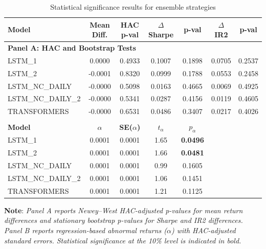 \documentclass[]{elsarticle}
\begin{document}
\begin{table}[H]
\centering
\small
\setlength{\tabcolsep}{3pt}
\renewcommand{\arraystretch}{1.1}

\caption{Statistical significance results for ensemble strategies}
\label{tab:ensemble_stat}

\begin{tabular}{lcccccc}

\toprule
\textbf{Model} &
\textbf{Mean Diff.} &
\textbf{HAC p-val} &
\textbf{$\Delta$ Sharpe} &
\textbf{p-val} &
\textbf{$\Delta$ IR2} &
\textbf{p-val} \\
\midrule

\multicolumn{7}{l}{\textbf{Panel A: HAC and Bootstrap Tests}} \\
\midrule
LSTM\_1      &  0.0000 & 0.4933 & 0.1007 & 0.1898 & 0.0705 & 0.2537 \\
LSTM\_2      & -0.0001 & 0.8320 & 0.0999 & 0.1788 & 0.0553 & 0.2458 \\
LSTM\_NC\_DAILY   & -0.0000 & 0.5098 & 0.0163 & 0.4665 & 0.0069 & 0.4925 \\
LSTM\_NC\_DAILY\_2 & -0.0000 & 0.5341 & 0.0287 & 0.4156 & 0.0119 & 0.4605 \\
TRANSFORMERS & -0.0000 & 0.6531 & 0.0486 & 0.3407 & 0.0217 & 0.4026 \\

\addlinespace

\multicolumn{7}{l}{\textbf{Panel B: Regression (HAC-adjusted)}} \\
\midrule
\textbf{Model} & \textbf{$\alpha$} & \textbf{SE($\alpha$)} & \textbf{$t_\alpha$} & \textbf{$p_\alpha$} & \multicolumn{2}{c}{} \\
\midrule
LSTM\_1      & 0.0001 & 0.0001 & 1.65 & \textbf{0.0496} & \multicolumn{2}{c}{} \\
LSTM\_2      & 0.0001 & 0.0001 & 1.66 & \textbf{0.0481} & \multicolumn{2}{c}{} \\
LSTM\_NC\_DAILY   & 0.0001 & 0.0001 & 0.99 & 0.1605 & \multicolumn{2}{c}{} \\
LSTM\_NC\_DAILY\_2 & 0.0001 & 0.0001 & 1.06 & 0.1451 & \multicolumn{2}{c}{} \\
TRANSFORMERS & 0.0001 & 0.0001 & 1.21 & 0.1125 & \multicolumn{2}{c}{} \\

\bottomrule

\end{tabular}
\end{table}

\vspace{-0.4cm}
\noindent\linespread{0.65}\selectfont
{\scriptsize \textbf{Note}: \textit{Panel A reports Newey--West HAC-adjusted p-values for mean return differences and stationary bootstrap p-values for Sharpe and IR2 differences. Panel B reports regression-based abnormal returns ($\alpha$) with HAC-adjusted standard errors. Statistical significance at the 10\% level is indicated in bold.}}
\end{document}
